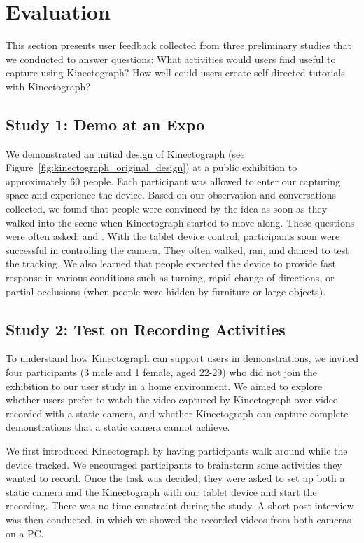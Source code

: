 \section{Evaluation}
\label{kinectograph_study}

This section presents user feedback collected from three preliminary studies that we conducted to answer questions: What activities would users find useful to capture using Kinectograph? How well could users create self-directed tutorials with Kinectograph?

\subsection{Study 1: Demo at an Expo}
We demonstrated an initial design of Kinectograph (see Figure~\ref{fig:kinectograph_original_design}) at a public exhibition to approximately 60 people. Each participant was allowed to enter our capturing space and experience the device. Based on our observation and conversations collected, we found that people were convinced by the idea as soon as they walked into the scene when Kinectograph started to move along. These questions were often asked:  and . With the tablet device control, participants soon were successful in controlling the camera. They often walked, ran, and danced to test the tracking. We also learned that people expected the device to provide fast response in various conditions such as turning, rapid change of directions, or partial occlusions (when people were hidden by furniture or large objects).

\subsection{Study 2: Test on Recording Activities}
To understand how Kinectograph can support users in demonstrations, we invited four participants (3 male and 1 female, aged 22-29) who did not join the exhibition to our user study in a home environment. We aimed to explore whether users prefer to watch the video captured by Kinectograph over video recorded with a static camera, and whether Kinectograph can capture complete demonstrations
 that a static camera cannot achieve.

We first introduced Kinectograph by having participants walk around while the device tracked. We encouraged participants to brainstorm some activities they wanted to record. Once the task was decided, they were asked to set up both a static camera and the Kinectograph with our tablet device and start the recording. There was no time constraint during the study. A short post interview was then conducted, in which we showed the recorded videos from both cameras on a PC.

